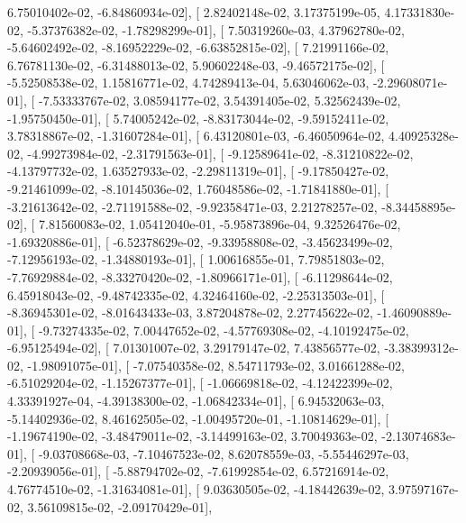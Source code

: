 \documentclass{article}
\begin{document}
          6.75010402e-02,  -6.84860934e-02],
       [  2.82402148e-02,   3.17375199e-05,   4.17331830e-02,
         -5.37376382e-02,  -1.78298299e-01],
       [  7.50319260e-03,   4.37962780e-02,  -5.64602492e-02,
         -8.16952229e-02,  -6.63852815e-02],
       [  7.21991166e-02,   6.76781130e-02,  -6.31488013e-02,
          5.90602248e-03,  -9.46572175e-02],
       [ -5.52508538e-02,   1.15816771e-02,   4.74289413e-04,
          5.63046062e-03,  -2.29608071e-01],
       [ -7.53333767e-02,   3.08594177e-02,   3.54391405e-02,
          5.32562439e-02,  -1.95750450e-01],
       [  5.74005242e-02,  -8.83173044e-02,  -9.59152411e-02,
          3.78318867e-02,  -1.31607284e-01],
       [  6.43120801e-03,  -6.46050964e-02,   4.40925328e-02,
         -4.99273984e-02,  -2.31791563e-01],
       [ -9.12589641e-02,  -8.31210822e-02,  -4.13797732e-02,
          1.63527933e-02,  -2.29811319e-01],
       [ -9.17850427e-02,  -9.21461099e-02,  -8.10145036e-02,
          1.76048586e-02,  -1.71841880e-01],
       [ -3.21613642e-02,  -2.71191588e-02,  -9.92358471e-03,
          2.21278257e-02,  -8.34458895e-02],
       [  7.81560083e-02,   1.05412040e-01,  -5.95873896e-04,
          9.32526476e-02,  -1.69320886e-01],
       [ -6.52378629e-02,  -9.33958808e-02,  -3.45623499e-02,
         -7.12956193e-02,  -1.34880193e-01],
       [  1.00616855e-01,   7.79851803e-02,  -7.76929884e-02,
         -8.33270420e-02,  -1.80966171e-01],
       [ -6.11298644e-02,   6.45918043e-02,  -9.48742335e-02,
          4.32464160e-02,  -2.25313503e-01],
       [ -8.36945301e-02,  -8.01643433e-03,   3.87204878e-02,
          2.27745622e-02,  -1.46090889e-01],
       [ -9.73274335e-02,   7.00447652e-02,  -4.57769308e-02,
         -4.10192475e-02,  -6.95125494e-02],
       [  7.01301007e-02,   3.29179147e-02,   7.43856577e-02,
         -3.38399312e-02,  -1.98091075e-01],
       [ -7.07540358e-02,   8.54711793e-02,   3.01661288e-02,
         -6.51029204e-02,  -1.15267377e-01],
       [ -1.06669818e-02,  -4.12422399e-02,   4.33391927e-04,
         -4.39138300e-02,  -1.06842334e-01],
       [  6.94532063e-03,  -5.14402936e-02,   8.46162505e-02,
         -1.00495720e-01,  -1.10814629e-01],
       [ -1.19674190e-02,  -3.48479011e-02,  -3.14499163e-02,
          3.70049363e-02,  -2.13074683e-01],
       [ -9.03708668e-03,  -7.10467523e-02,   8.62078559e-03,
         -5.55446297e-03,  -2.20939056e-01],
       [ -5.88794702e-02,  -7.61992854e-02,   6.57216914e-02,
          4.76774510e-02,  -1.31634081e-01],
       [  9.03630505e-02,  -4.18442639e-02,   3.97597167e-02,
          3.56109815e-02,  -2.09170429e-01],
\end{document}

